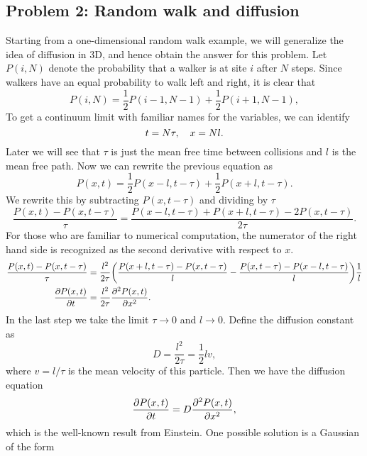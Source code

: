 \documentclass[10pt]{article}
\begin{document}
\subsection{Problem 2: Random walk and diffusion}
Starting from a one-dimensional random walk example, we will generalize the idea of diffusion in 3D, and hence obtain the answer for this problem. Let $P (i, N )$ denote the probability that a walker is at site $i$ after $N$ steps. Since walkers have an equal probability to walk left and right, it is clear that
\begin{equation}
	P(i, N) = \frac{1}{2} P(i-1, N-1) + \frac{1}{2} P(i+1, N-1),
\end{equation}
To get a continuum limit with familiar names for the variables, we can identify
\begin{equation}
	t = N\tau\qc x = Nl.
\end{equation}
Later we will see that $\tau$ is just the mean free time between collisions and $l$ is the mean free path. Now we can rewrite the previous equation as
\begin{equation}
	P(x,t) = \frac{1}{2} P(x-l,t-\tau) + \frac{1}{2} P(x+l,t-\tau).
\end{equation}
We rewrite this by subtracting $P (x, t-\tau )$ and dividing by $\tau$
\begin{equation}
	\frac{P(x,t) - P(x, t-\tau)}{\tau} = \frac{ P(x-l,t-\tau) + P(x+l,t-\tau)- 2P(x,t-\tau)}{2\tau}.
\end{equation}
For those who are familiar to numerical computation, the numerator of the right hand side is recognized as the second derivative with respect to $x$. 
\begin{align*}
	\frac{P(x,t) - P(x, t-\tau)}{\tau} &= \frac{l^2}{2\tau} \qty(\frac{P(x+l,t-\tau) - P(x,t-\tau)}{l} - \frac{P(x,t-\tau) - P(x-l,t-\tau)}{l}) \frac{1}{l} \\
	\pdv{P(x,t)}{t}					   &= \frac{l^2}{2\tau} \pdv[2]{P(x,t)}{x}.
\end{align*}
In the last step we take the limit $\tau \to 0$ and $l \to 0$. Define the diffusion constant as 
\begin{equation}
	D =  \frac{l^2}{2\tau} = \frac{1}{2} l v,
\end{equation}
where $v= l / \tau$ is the mean velocity of this particle. Then we have the diffusion equation 
\begin{equation}
	\pdv{P(x,t)}{t} = D \pdv[2]{P(x,t)}{x},
\end{equation}
which is the well-known result from Einstein. One possible solution is a Gaussian of the form 
\end{document}
